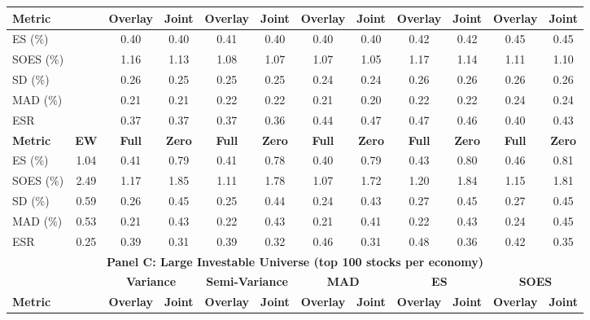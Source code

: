 \begin{tabular}{l*{11}{c}}
    \cmidrule(lr){3-4} \cmidrule(lr){5-6} \cmidrule(lr){7-8} \cmidrule(lr){9-10} \cmidrule(lr){11-12}
    \textbf{Metric} &  & \textbf{Overlay} & \textbf{Joint} & \textbf{Overlay} & \textbf{Joint} & \textbf{Overlay} & \textbf{Joint} & \textbf{Overlay} & \textbf{Joint} & \textbf{Overlay} & \textbf{Joint} \\
    \midrule
    ES (\%) &  & 0.40 & 0.40 & 0.41 & 0.40 & 0.40 & 0.40 & 0.42 & 0.42 & 0.45 & 0.45 \\
    SOES (\%) &  & 1.16 & 1.13 & 1.08 & 1.07 & 1.07 & 1.05 & 1.17 & 1.14 & 1.11 & 1.10 \\
    SD (\%) &  & 0.26 & 0.25 & 0.25 & 0.25 & 0.24 & 0.24 & 0.26 & 0.26 & 0.26 & 0.26 \\
    MAD (\%) &  & 0.21 & 0.21 & 0.22 & 0.22 & 0.21 & 0.20 & 0.22 & 0.22 & 0.24 & 0.24 \\
    ESR &  & 0.37 & 0.37 & 0.37 & 0.36 & 0.44 & 0.47 & 0.47 & 0.46 & 0.40 & 0.43 \\
    \midrule
    \textbf{Metric} & \textbf{EW} & \textbf{Full} & \textbf{Zero} & \textbf{Full} & \textbf{Zero} & \textbf{Full} & \textbf{Zero} & \textbf{Full} & \textbf{Zero} & \textbf{Full} & \textbf{Zero} \\
    \midrule
    ES (\%) & 1.04 & 0.41 & 0.79 & 0.41 & 0.78 & 0.40 & 0.79 & 0.43 & 0.80 & 0.46 & 0.81 \\
    SOES (\%) & 2.49 & 1.17 & 1.85 & 1.11 & 1.78 & 1.07 & 1.72 & 1.20 & 1.84 & 1.15 & 1.81 \\
    SD (\%) & 0.59 & 0.26 & 0.45 & 0.25 & 0.44 & 0.24 & 0.43 & 0.27 & 0.45 & 0.27 & 0.45 \\
    MAD (\%) & 0.53 & 0.21 & 0.43 & 0.22 & 0.43 & 0.21 & 0.41 & 0.22 & 0.43 & 0.24 & 0.45 \\
    ESR & 0.25 & 0.39 & 0.31 & 0.39 & 0.32 & 0.46 & 0.31 & 0.48 & 0.36 & 0.42 & 0.35 \\
    \midrule
    \multicolumn{12}{c}{\textbf{Panel C: Large Investable Universe (top 100 stocks per economy)}} \\
    \midrule
    & & \multicolumn{2}{c}{\textbf{Variance}} & \multicolumn{2}{c}{\textbf{Semi-Variance}} & \multicolumn{2}{c}{\textbf{MAD}} & \multicolumn{2}{c}{\textbf{ES}} & \multicolumn{2}{c}{\textbf{SOES}} \\
    \cmidrule(lr){3-4} \cmidrule(lr){5-6} \cmidrule(lr){7-8} \cmidrule(lr){9-10} \cmidrule(lr){11-12}
    \textbf{Metric} &  & \textbf{Overlay} & \textbf{Joint} & \textbf{Overlay} & \textbf{Joint} & \textbf{Overlay} & \textbf{Joint} & \textbf{Overlay} & \textbf{Joint} & \textbf{Overlay} & \textbf{Joint} \\

\end{tabular}
